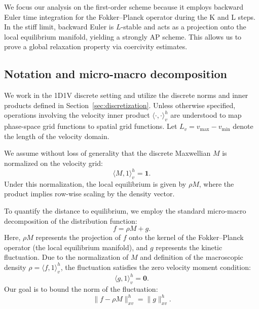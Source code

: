 \documentclass[]{article}
\numberwithin{equation}{section}
\newcommand{\modifyfirst}[1]{#1}
\begin{document}
We focus our analysis on the first-order scheme because it employs backward Euler time integration for the Fokker--Planck operator during the K and L steps. In the stiff limit, backward Euler is $L$-stable and acts as a projection onto the local equilibrium manifold, yielding a strongly AP scheme. This allows us to prove a global relaxation property via coercivity estimates. 


\subsection{Notation and micro-macro decomposition}

We work in the 1D1V discrete setting and utilize the discrete norms and inner products defined in Section~\ref{sec:discretization}. Unless otherwise specified, operations involving the velocity inner product $\langle \cdot, \cdot \rangle_v^h$ are understood to map phase-space grid functions to spatial grid functions. Let $L_v = v_{\max} - v_{\min}$ denote the length of the velocity domain.

We assume without loss of generality that the discrete Maxwellian $M$ is normalized on the velocity grid:
\begin{equation}
    \langle M, 1 \rangle_v^h = \mathbf{1}.
\end{equation}
Under this normalization, the local equilibrium is given by $\rho M$, where the product implies row-wise scaling by the density vector.

To quantify the distance to equilibrium, we employ the standard micro-macro decomposition of the distribution function:
\begin{equation} \label{eq:micro_macro_def}
    f = \rho M + g.
\end{equation}
Here, $\rho M$ represents the projection of $f$ onto the kernel of the Fokker--Planck operator (the local equilibrium manifold), and $g$ represents the kinetic fluctuation. Due to the normalization of $M$ and definition of the macroscopic density $\rho = \langle f, 1 \rangle_v^h$, the fluctuation satisfies \modifyfirst{the zero velocity moment condition}:
\begin{equation}
    \langle g, 1 \rangle_v^h = \mathbf{0}.
\end{equation}
Our goal is to bound the norm of the fluctuation:
\begin{equation}
    \| f - \rho M \|_{xv}^h = \| g \|_{xv}^h.
\end{equation}
\end{document}
